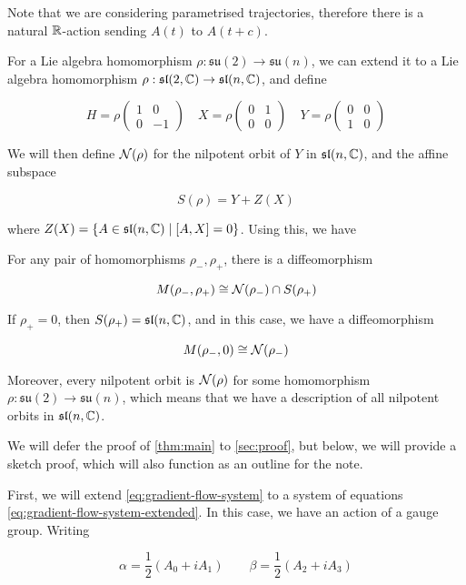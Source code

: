 \documentclass{article}
\newcommand{\su}{\mathfrak{su}}
\renewcommand{\sl}{\mathfrak{sl}}
\begin{document}
Note that we are considering parametrised trajectories, therefore there is a natural \(\mathbb{R}\)-action sending \(A(t)\) to \(A(t+c)\).

For a Lie algebra homomorphism \(\rho : \su(2) \to \su(n)\), we can extend it to a Lie algebra homomorphism \(\rho : \sl(2, \C) \to \sl(n, \C)\), and define

\[H = \rho\begin{pmatrix}
    1 & 0 \\
    0 & -1
\end{pmatrix}\quad X = \rho\begin{pmatrix}
    0 & 1 \\
    0 & 0
\end{pmatrix} \quad Y = \rho\begin{pmatrix}
    0 & 0 \\
    1 & 0
\end{pmatrix}\]

We will then define \(\mathcal{N}(\rho)\) for the nilpotent orbit of \(Y\) in \(\sl(n, \C)\), and the affine subspace

\[S(\rho) = Y + Z(X)\]

where \(Z(X) = \left\{A \in \sl(n, \C) \mid [A, X] = 0\right\}\). Using this, we have

\begin{theorem}
    \label{thm:main}

    For any pair of homomorphisms \(\rho_-, \rho_+\), there is a diffeomorphism

    \[M(\rho_-, \rho_+) \cong \mathcal{N}(\rho_-) \cap S(\rho_+)\]
\end{theorem}

If \(\rho_+ = 0\), then \(S(\rho_+) = \sl(n, \C)\), and in this case, we have a diffeomorphism

\[M(\rho_-, 0) \cong \mathcal{N}(\rho_-)\]

Moreover, every nilpotent orbit is \(\mathcal{N}(\rho)\) for some homomorphism \(\rho : \su(2) \to \su(n)\), which means that we have a description of all nilpotent orbits in \(\sl(n, \C)\).

We will defer the proof of \cref{thm:main} to \cref{sec:proof}, but below, we will provide a sketch proof, which will also function as an outline for the note.

First, we will extend \cref{eq:gradient-flow-system} to a system of equations \cref{eq:gradient-flow-system-extended}. In this case, we have an action of a gauge group. Writing

\[\alpha = \frac{1}{2}(A_0 + iA_1) \qquad \beta = \frac12(A_2 + iA_3)\]
\end{document}
